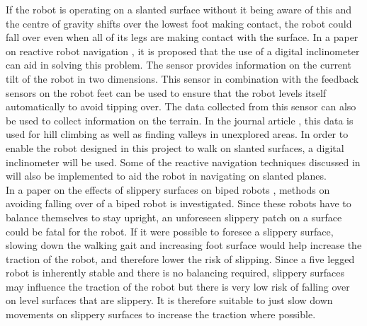 If the robot is operating on a slanted surface without it being aware of this and the centre of gravity shifts over the lowest foot making contact, the robot could fall over even when all of its legs are making contact with the surface. In a paper on reactive robot navigation \cite{Arkin:Reactive}, it is proposed that the use of a digital inclinometer can aid in solving this problem. The sensor provides information on the current tilt of the robot in two dimensions. This sensor in combination with the feedback sensors on the robot feet can be used to ensure that the robot levels itself automatically to avoid tipping over. The data collected from this sensor can also be used to collect information on the terrain. In the journal article \cite{Arkin:Reactive}, this data is used for hill climbing as well as finding valleys in unexplored areas. In order to enable the robot designed in this project to walk on slanted surfaces, a digital inclinometer will be used. Some of the reactive navigation techniques discussed in \cite{Arkin:Reactive} will also be implemented to aid the robot in navigating on slanted planes.\\

In a paper on the effects of slippery surfaces on biped robots \cite{Hyeon:Reflex}, methods on avoiding falling over of a biped robot is investigated. Since these robots have to balance themselves to stay upright, an unforeseen slippery patch on a surface could be fatal for the robot. If it were possible to foresee a slippery surface, slowing down the walking gait and increasing foot surface would help increase the traction of the robot, and therefore lower the risk of slipping. Since a five legged robot is inherently stable and there is no balancing required, slippery surfaces may influence the traction of the robot but there is very low risk of falling over on level surfaces that are slippery. It is therefore suitable to just slow down movements on slippery surfaces to increase the traction where possible.

\newpage
